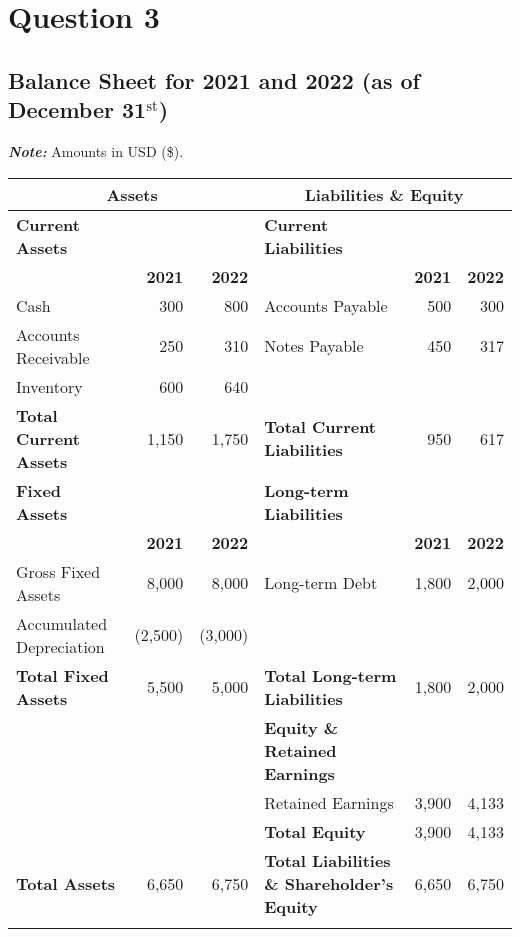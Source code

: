 \documentclass{article}
\begin{document}
\section*{Question 3}
\subsection*{Balance Sheet for 2021 and 2022 (as of December 31$^{\text{st}}$)}
\textbf{\textit{Note:}} Amounts in USD (\$). \\
\begin{adjustbox}{center}
\begin{tabular}{l r r l r r}
  \toprule
\multicolumn{3}{c}{\textbf{Assets}} & \multicolumn{3}{c}{\textbf{Liabilities \& Equity}} \\
  \midrule 
\textbf{Current Assets} & & & \textbf{Current Liabilities} \\
& \textbf{2021} & \textbf{2022} & & \textbf{2021} & \textbf{2022} \\
  Cash & 300 & 800 & Accounts Payable & 500 & 300 \\
  Accounts Receivable & 250 & 310 & Notes Payable & 450 & 317 \\
  Inventory &  600 & 640 \\
\textbf{Total Current Assets} & 1,150 & 1,750 & \textbf{Total Current Liabilities} & 950 & 617 \\
\midrule
\textbf{Fixed Assets} & & & \textbf{Long-term Liabilities} \\
& \textbf{2021} & \textbf{2022} & & \textbf{2021} & \textbf{2022} \\
Gross Fixed Assets & 8,000 & 8,000 & Long-term Debt & 1,800 & 2,000 \\
Accumulated Depreciation & (2,500) & (3,000) \\
\textbf{Total Fixed Assets} & 5,500 & 5,000 & \textbf{Total Long-term Liabilities} & 1,800 & 2,000 \\
\midrule
& & & \textbf{Equity \& Retained Earnings} \\
& & & Retained Earnings & 3,900 & 4,133 \\
& & & \textbf{Total Equity} & 3,900 & 4,133 \\
\midrule
  \textbf{Total Assets} & 6,650 & 6,750 & \textbf{Total Liabilities \& Shareholder's Equity} & 6,650 & 6,750 \\ \\
\bottomrule
\end{tabular}
\end{adjustbox}
\end{document}
